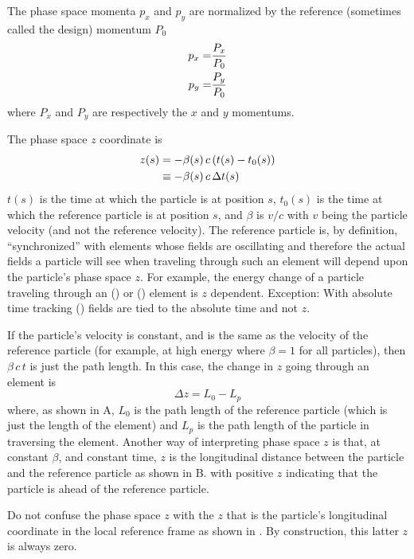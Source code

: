 The phase space momenta $p_x$ and $p_y$ are normalized by the
reference (sometimes called the design) momentum $P_0$
\begin{align}
  p_x = &\frac{P_x}{P_0} \nonumber \\
  p_y = &\frac{P_y}{P_0}
  \label{ppp}
\end{align}
where $P_x$ and $P_y$ are respectively the $x$ and $y$ momentums.

The phase space $z$ coordinate is 
\begin{align}
  z(s) &= -\beta(s) \, c \, (t(s) - t_0(s)) \nonumber \\
    &\equiv - \beta(s) \, c \, \Delta t(s)
  \label{zbctt}
\end{align}
$t(s)$ is the time at which the particle is at position $s$, $t_0(s)$ is the time at which the
reference particle is at position $s$, and $\beta$ is $v/c$ with $v$ being the particle velocity
(and not the reference velocity). The reference particle is, by definition, ``synchronized'' with
elements whose fields are oscillating and therefore the actual fields a particle will see when
traveling through such an element will depend upon the particle's phase space $z$. For example, the
energy change of a particle traveling through an  () or 
() element is $z$ dependent. Exception: With absolute time tracking ()
fields are tied to the absolute time and not $z$.

If the particle's velocity is constant, and is the same as the velocity of the reference particle
(for example, at high energy where $\beta = 1$ for all particles), then $\beta \, c \, t$ is just
the path length. In this case, the change in $z$ going through an element is
\begin{equation}
  \Delta z = L_0 - L_p
\end{equation}
where, as shown in A, $L_0$ is the path length of the reference particle (which
is just the length of the element) and $L_p$ is the path length of the particle in traversing the
element.  Another way of interpreting phase space $z$ is that, at constant $\beta$, and constant
time, $z$ is the longitudinal distance between the particle and the reference particle as shown in
B. with positive $z$ indicating that the particle is ahead of the reference
particle.

Do not confuse the phase space $z$ with the $z$ that is the particle's longitudinal coordinate in
the local reference frame as shown in . By construction, this latter $z$ is
always zero.

